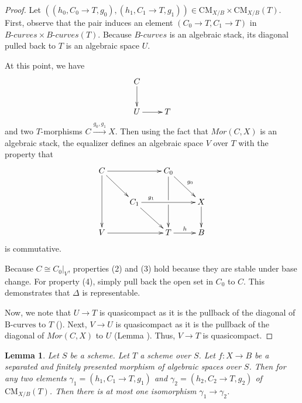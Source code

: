 \documentclass{stacks-project}
\theoremstyle{plain}
\newtheorem{lemma}[subsection]{Lemma}
\theoremstyle{definition}
\theoremstyle{remark}
\numberwithin{equation}{subsection}
\def\CMfunctor{\mathcal{C}\!{\it oh}}
\def\CMfunctor{\text{CM}}
\begin{document}
\begin{proof}
	Let $( (h_0,C_0\rightarrow T, g_0) ,( h_1, C_1\rightarrow T, g_1))\in \CMfunctor_{X/B}\times\CMfunctor_{X/B}(T)$.
	First, observe that the pair induces an element $(C_0\rightarrow T,C_1\rightarrow T)$ in $\textit{B-curves}\times \textit{B-curves}(T)$.
	Because $\textit{B-curves}$ is an algebraic stack, its diagonal pulled back to $T$ is an algebraic space $U$.

	At this point, we have
	\[\xymatrix{
		C\ar[d] & \\
		U\ar[r] & T
	}\]
	and two $T$-morphisms $C\xrightarrow{g_0,g_1} X$.
	Then using the fact that $Mor(C,X)$ is an algebraic stack, the equalizer defines an algebraic space $V$ over $T$ with the property that
	\[\xymatrix{
		C\ar[rr]\ar[dr]\ar[dd]&&C_0\ar[dd]|!{[dl];[dr]}\hole\ar[dr]^{g_0}&\\
		&C_1\ar[rr]^(.25){g_1}\ar[dr]& & X\ar[d]\\
		V\ar[rr]& & T\ar[r]^{h} & B
	}
	\]
	is commutative.

	Because $C\cong C_0|_V$, properties (2) and (3) hold because they are stable under base change.
	For property (4), simply pull back the open set in $C_0$ to $C$.
	This demonstrates that $\Delta$ is representable.

	Now, we note that $U\rightarrow T$ is quasicompact as it is the pullback of the diagonal of $\text{B-curves}$ to $T$ (\cite[Tag 0DSQ]{stacks-project}).
	Next, $V\rightarrow U$ is quasicompact as it is the pullback of the diagonal of $Mor(C,X)$ to $U$ (Lemma \cite[Tag 0DPM]{stacks-project}).
	Thus, $V\rightarrow T$ is quasicompact.
\end{proof}
\begin{lemma}\label{cm-fibered-in-setoids}
Let $S$ be a scheme.
Let $T$ a scheme over $S$.
Let $f \colon X \to B$ be a separated and finitely presented morphism of algebraic spaces over $S$.
Then for any two elements $\gamma_1 = (h_1,C_1 \to T,g_1)$ and $\gamma_2 = (h_2,C_2 \to T,g_2)$ of $\CMfunctor_{X/B}(T)$.
Then there is at most one isomorphism $\gamma_1 \to \gamma_2$.
\end{lemma}
\end{document}
